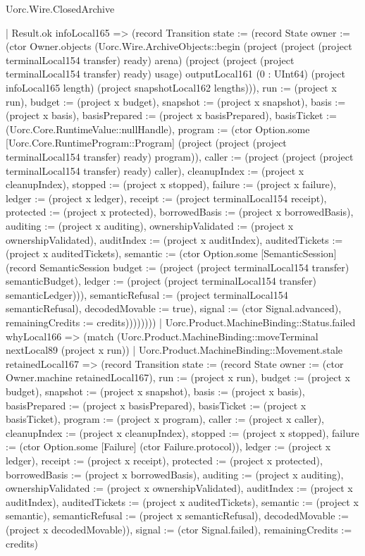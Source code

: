 \begin{lexlean}{Uorc.Wire.ClosedArchive}
\begin{semanticmodule}
{                | Result.ok infoLocal165 => (record Transition {state := (record State {owner := (ctor Owner.objects (Uorc.Wire.ArchiveObjects::begin (project (project (project terminalLocal154 transfer) ready) arena) (project (project (project terminalLocal154 transfer) ready) usage) outputLocal161 (0 : UInt64) (project infoLocal165 length) (project snapshotLocal162 lengths))), run := (project x run), budget := (project x budget), snapshot := (project x snapshot), basis := (project x basis), basisPrepared := (project x basisPrepared), basisTicket := (Uorc.Core.RuntimeValue::nullHandle), program := (ctor Option.some [Uorc.Core.RuntimeProgram::Program] (project (project (project terminalLocal154 transfer) ready) program)), caller := (project (project (project terminalLocal154 transfer) ready) caller), cleanupIndex := (project x cleanupIndex), stopped := (project x stopped), failure := (project x failure), ledger := (project x ledger), receipt := (project terminalLocal154 receipt), protected := (project x protected), borrowedBasis := (project x borrowedBasis), auditing := (project x auditing), ownershipValidated := (project x ownershipValidated), auditIndex := (project x auditIndex), auditedTickets := (project x auditedTickets), semantic := (ctor Option.some [SemanticSession] (record SemanticSession {budget := (project (project terminalLocal154 transfer) semanticBudget), ledger := (project (project terminalLocal154 transfer) semanticLedger)})), semanticRefusal := (project terminalLocal154 semanticRefusal), decodedMovable := true}), signal := (ctor Signal.advanced), remainingCredits := credits}))))))))
    | Uorc.Product.MachineBinding::Status.failed whyLocal166 => (match (Uorc.Product.MachineBinding::moveTerminal nextLocal89 (project x run))
      | Uorc.Product.MachineBinding::Movement.stale retainedLocal167 => (record Transition {state := (record State {owner := (ctor Owner.machine retainedLocal167), run := (project x run), budget := (project x budget), snapshot := (project x snapshot), basis := (project x basis), basisPrepared := (project x basisPrepared), basisTicket := (project x basisTicket), program := (project x program), caller := (project x caller), cleanupIndex := (project x cleanupIndex), stopped := (project x stopped), failure := (ctor Option.some [Failure] (ctor Failure.protocol)), ledger := (project x ledger), receipt := (project x receipt), protected := (project x protected), borrowedBasis := (project x borrowedBasis), auditing := (project x auditing), ownershipValidated := (project x ownershipValidated), auditIndex := (project x auditIndex), auditedTickets := (project x auditedTickets), semantic := (project x semantic), semanticRefusal := (project x semanticRefusal), decodedMovable := (project x decodedMovable)}), signal := (ctor Signal.failed), remainingCredits := credits})
}
\end{semanticmodule}
\end{lexlean}
